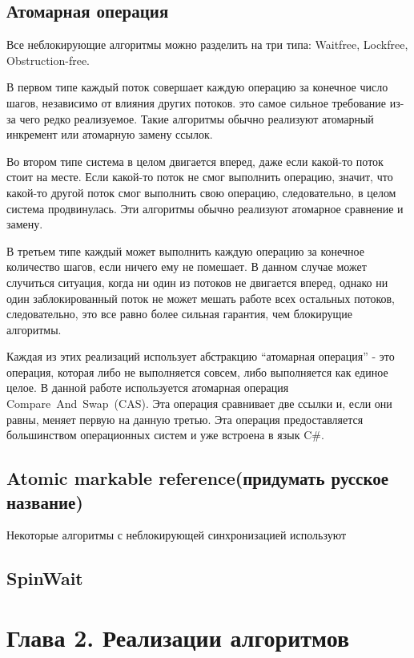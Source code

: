 \documentclass[12pt]{article}
\begin{document}
{			\subsection{Атомарная операция}
				\par Все неблокирующие алгоритмы можно разделить на три типа: Waitfree, Lockfree, Obstruction-free.
				\par В первом типе каждый поток совершает каждую операцию за конечное число шагов, независимо от влияния других потоков. это самое сильное требование из-за чего редко реализуемое. Такие алгоритмы обычно реализуют атомарный инкремент или атомарную замену ссылок.
				\par Во втором типе система в целом двигается вперед, даже если какой-то поток стоит на месте. Если какой-то поток не смог выполнить операцию, значит, что какой-то другой поток смог выполнить свою операцию, следовательно, в целом система продвинулась. Эти алгоритмы обычно реализуют атомарное сравнение и замену.
				\par В третьем типе каждый может выполнить каждую операцию за конечное количество шагов, если ничего ему не помешает. В данном случае может случиться ситуация, когда ни один из потоков не двигается вперед, однако ни один заблокированный поток не может мешать работе всех остальных потоков, следовательно, это все равно более сильная гарантия, чем блокирущие алгоритмы.
				\par Каждая из этих реализаций использует абстракцию “атомарная операция” - это операция, которая либо не выполняется совсем, либо выполняется как единое целое. В данной работе используется атомарная операция Compare~And~Swap~(CAS). Эта операция сравнивает две ссылки и, если они равны, меняет первую на данную третью. Эта операция предоставляется большинством операционных систем и уже встроена в язык C\#.
			\subsection{Atomic markable reference(придумать русское название)}
				\par Некоторые алгоритмы с неблокирующей синхронизацией используют
			
			\subsection{SpinWait}
		
		\newpage
		
		\section{Глава 2. Реализации алгоритмов}
		
}
\end{document}
